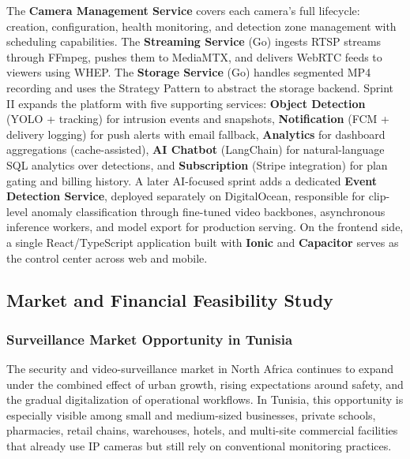\documentclass[12pt,a4paper,oneside]{report}
\begin{document}
\hspace{0.8cm}The \textbf{Camera Management Service} covers each camera's full lifecycle: creation, configuration, health monitoring, and detection zone management with scheduling capabilities. The \textbf{Streaming Service} (Go) ingests RTSP streams through FFmpeg, pushes them to MediaMTX, and delivers WebRTC feeds to viewers using WHEP. The \textbf{Storage Service} (Go) handles segmented MP4 recording and uses the Strategy Pattern to abstract the storage backend. Sprint II expands the platform with five supporting services: \textbf{Object Detection} (YOLO + tracking) for intrusion events and snapshots, \textbf{Notification} (FCM + delivery logging) for push alerts with email fallback, \textbf{Analytics} for dashboard aggregations (cache-assisted), \textbf{AI Chatbot} (LangChain) for natural-language SQL analytics over detections, and \textbf{Subscription} (Stripe integration) for plan gating and billing history. A later AI-focused sprint adds a dedicated \textbf{Event Detection Service}, deployed separately on DigitalOcean, responsible for clip-level anomaly classification through fine-tuned video backbones, asynchronous inference workers, and model export for production serving. On the frontend side, a single React/TypeScript application built with \textbf{Ionic} and \textbf{Capacitor} serves as the control center across web and mobile.

\subsection{Market and Financial Feasibility Study}
\label{subsec:market_financial_feasibility}

\subsubsection{Surveillance Market Opportunity in Tunisia}
\hspace{0.8cm}The security and video-surveillance market in North Africa continues to expand under the combined effect of urban growth, rising expectations around safety, and the gradual digitalization of operational workflows. In Tunisia, this opportunity is especially visible among small and medium-sized businesses, private schools, pharmacies, retail chains, warehouses, hotels, and multi-site commercial facilities that already use IP cameras but still rely on conventional monitoring practices.
\end{document}
